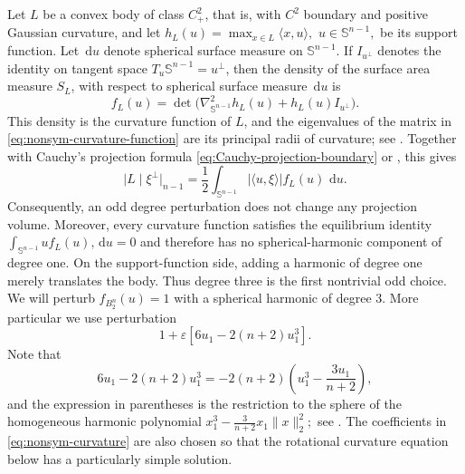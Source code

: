 \documentclass[11pt]{article}
\theoremstyle{remark}
\newcommand{\Sph}{\mathbb{S}}
\newcommand{\dd}{\,\mathrm{d}}
\newcommand{\norm}[1]{\lVert #1\rVert}
\begin{document}
Let $L$ be a convex body of class $C^2_+$, that is, with $C^2$ boundary
and positive Gaussian curvature, and let
$
 h_L(u)=\max_{x\in L}\langle x,u\rangle,$ $ u\in\Sph^{n-1},
$
be its support function.  Let $\dd u$ denote spherical surface measure on
$\Sph^{n-1}$.  If $I_{u^\perp}$ denotes the identity on tangent space 
$T_u\Sph^{n-1}=u^\perp$, then the density of the surface area measure 
$S_L$, with respect to spherical surface measure $\dd u$ is
\begin{equation}\label{eq:nonsym-curvature-function}
 f_L(u)=
 \det\bigl(\nabla_{\Sph^{n-1}}^2h_L(u)
              +h_L(u)I_{u^\perp}\bigr).
\end{equation}
This density is the curvature function of $L$, and the eigenvalues of the
matrix in \eqref{eq:nonsym-curvature-function} are its principal radii of
curvature; see
\cite[Corollaries~2.5.2 and~2.5.3 and pp.~115--120]{SchneiderBook}.
Together with Cauchy's projection formula  \eqref{eq:Cauchy-projection-boundary} or 
\cite[Formula~(A.45), p.~408]{GardnerBook}, this gives
\begin{equation}\label{eq:nonsym-Cauchy}
 \bigl|L\mid\xi^\perp\bigr|_{n-1}
 =\frac12\int_{\Sph^{n-1}}
       |\langle u,\xi\rangle|f_L(u)\,\dd u.
\end{equation}
Consequently, an odd degree perturbation 
does not change any projection volume.
Moreover, every curvature function satisfies the equilibrium identity
$
\int_{\Sph^{n-1}}u f_L(u),\dd u=0 
$
and therefore has no spherical-harmonic component of degree one. On the
support-function side, adding a harmonic of degree one merely translates
the body. Thus degree three is the first nontrivial odd choice. We will perturb  $f_{B_2^n}(u)=1$ with a spherical harmonic of degree $3$. More particular we use perturbation  
\begin{equation}\label{eq:nonsym-curvature}
 1+\varepsilon\left[6 u_1-2(n+2) u_1^3\right].
\end{equation}
Note that 
\[
 6u_1-2(n+2)u_1^3
 =-2(n+2)\left(u_1^3-\frac{3u_1}{n+2}\right),
\]
and the expression in parentheses is the restriction to the sphere of the
homogeneous harmonic polynomial
$
 x_1^3-\frac{3}{n+2}x_1\norm{x}_2^2;
$
see \cite[Chapter~3]{Groemer}.  The coefficients in
\eqref{eq:nonsym-curvature} are also chosen so that the rotational
curvature equation below has a particularly simple solution.
\end{document}
